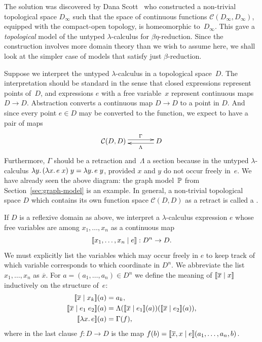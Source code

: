 The solution was discovered by Dana Scott~ who
constructed a non-trivial topological space $D_\infty$ such that the
space of continuous functions $\mathcal{C}(D_\infty, D_\infty)$,
equipped with the compact-open topology, is homeomorphic
to~$D_\infty$. This gave a \emph{topological} model of the untyped
$\lambda$-calculus for $\beta\eta$-reduction. Since the construction
involves more domain theory than we wish to assume here, we shall look
at the simpler case of models that satisfy just $\beta$-reduction.

Suppose we interpret the untyped $\lambda$-calculus in a topological
space~$D$. The interpretation should be standard in the sense that
closed expressions represent points of~$D$, and expressions $e$ with a
free variable~$x$ represent continuous maps $D \to D$. Abstraction
converts a continuous map $D \to D$ to a point in $D$. And since every
point $e \in D$ may be converted to the function, we expect to have a
pair of maps
%
\begin{equation*}
  \xymatrix{
    **[l]{\mathcal{C}(D, D)}
    \ar@<+0.25em>[r]^{\Gamma}
    &
    {D}
    \ar@<+0.25em>[l]^{\Lambda}
  }
\end{equation*}
%
Furthermore, $\Gamma$ should be a retraction and~$\Lambda$ a section
because in the untyped $\lambda$-calculus
$\lambda y .\,(\lambda x .\,e\;x)\; y = \lambda y .\,e\;y$, provided $x$ and
$y$ do not occur freely in~$e$. We have already seen the above
diagram: the graph model~$\mathbb{P}$ from Section~\ref{sec:graph-model}
is an example. In general, a non-trivial topological
space $D$ which contains its own function space $\mathcal{C}(D,D)$ as
a retract is called a .

If $D$ is a reflexive domain as above, we interpret a
$\lambda$-calculus expression $e$ whose free variables are among $x_1,
\ldots, x_n$ as a continuous map
%
\begin{equation*}
  [\![x_1, \ldots, x_n \mid e]\!] : D^n \to D.
\end{equation*}
%
We must explicitly list the variables which may occur freely in $e$ to
keep track of which variable corresponds to which coordinate in $D^n$.
We abbreviate the list $x_1, \ldots, x_n$ as $\overline{x}$. For $a = (a_1,
\ldots, a_n) \in D^n$ we define the meaning of $[\![\overline{x} \mid x]\!]$
inductively on the structure of~$e$:
%
\begin{align*}
  \sem{\overline{x} \ctx x_k}(a) &= a_k, \\
  \sem{\overline{x} \ctx e_1\; e_2}(a) &= 
  \Lambda(\sem{\overline{x} \ctx e_1}(a))(\sem{\overline{x} \ctx e_2}(a)), \\
  \sem{\xulam{x}{e}}(a) &= \Gamma(f),
\end{align*}
%
where in the last clause $f : D \to D$ is the map $f (b) =
[\![\overline{x}, x \mid e]\!](a_1, \ldots, a_n, b)$.

